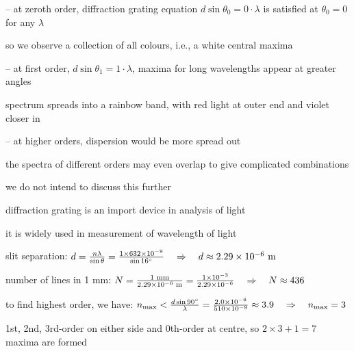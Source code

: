 \begin{compactitem}
	\item[--] at zeroth order, diffraction grating equation $d\sin\theta_0 = 0\cdot\lambda$ is satisfied at $\theta_0 = 0$ for any $\lambda$
	
	so we observe a collection of all colours, i.e., a white central maxima
	
	\item[--] at first order, $d\sin\theta_1 = 1\cdot\lambda$, maxima for long wavelengths appear at greater angles
	
	spectrum spreads into a rainbow band, with red light at outer end and violet closer in
	
	\item[--] at higher orders, dispersion would be more spread out 
	
	the spectra of different orders may even overlap to give complicated combinations
	
	we do not intend to discuss this further
\end{compactitem}

\cmt diffraction grating is an import device in analysis of light

it is widely used in measurement of wavelength of light


\sol slit separation: $d = \frac{n\lambda}{\sin\theta} = \frac{1\times632\times10^{-9}}{\sin 16^\circ} \quad \Rightarrow \quad d \approx 2.29 \times 10^{-6} \text{ m}$

number of lines in 1 mm: $N = \frac{1 \text{ mm}}{2.29 \times 10^{-6} \text{ m}} = \frac{1 \times 10^{-3}}{2.29 \times 10^{-6}} \quad \Rightarrow \quad N \approx 436$ \eoe


\sol to find highest order, we have: $n_{\text{max}} < \frac{d\sin 90^\circ}{\lambda} = \frac{2.0\times10^{-6}}{510\times10^{-9}} \approx 3.9 \quad \Rightarrow \quad n_{\text{max}} = 3$

1st, 2nd, 3rd-order on either side and 0th-order at centre, so $ 2\times 3 + 1 = 7$ maxima are formed

